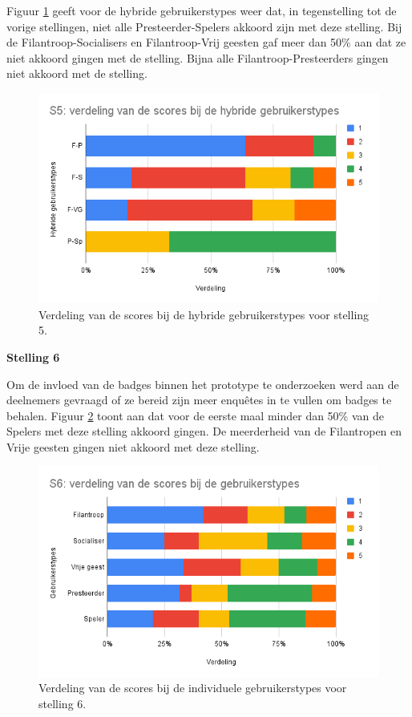 Figuur \ref{fig:s5_hybride} geeft voor de hybride gebruikerstypes weer dat, in tegenstelling tot de vorige stellingen, niet alle Presteerder-Spelers akkoord zijn met deze stelling. Bij de Filantroop-Socialisers en Filantroop-Vrij geesten gaf meer dan 50\% aan dat ze niet akkoord gingen met de stelling. Bijna alle Filantroop-Presteerders gingen niet akkoord met de stelling.

\begin{figure}
    \includegraphics[width=\linewidth]{S5_Hybride.png}
    \caption{Verdeling van de scores bij de hybride gebruikerstypes voor stelling 5.}
    \label{fig:s5_hybride}
\end{figure}

\textbf{Stelling 6}

Om de invloed van de badges binnen het prototype te onderzoeken werd aan de deelnemers gevraagd of ze bereid zijn meer enquêtes in te vullen om badges te behalen. Figuur \ref{fig:s6} toont aan dat voor de eerste maal minder dan 50\% van de Spelers met deze stelling akkoord gingen. De meerderheid van de Filantropen en Vrije geesten gingen niet akkoord met deze stelling.

\begin{figure}
    \includegraphics[width=\linewidth]{S6.png}
    \caption{Verdeling van de scores bij de individuele gebruikerstypes voor stelling 6.}
    \label{fig:s6}
\end{figure}

